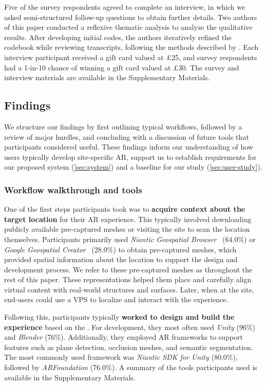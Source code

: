 Five of the survey respondents agreed to complete an interview, in which we asked semi-structured follow-up questions to obtain further details. Two authors of this paper conducted a reflexive thematic analysis to analyze the qualitative results. After developing initial codes, the authors iteratively refined the codebook while reviewing transcripts, following the methods described by \citet{braunThematicAnalysis2019}. Each interview participant received a gift card valued at £25, and survey respondents had a 1-in-10 chance of winning a gift card valued at £30. The survey and interview materials are available in the Supplementary Materials.

\subsection{Findings}
We structure our findings by first outlining typical workflows, followed by a review of major hurdles, and concluding with a discussion of future tools that participants considered useful. These findings inform our understanding of how users typically develop site-specific AR, support us to establish requirements for our proposed system (\cref{sec:system}) and a baseline for our study (\cref{sec:user-study}).

\subsubsection{Workflow walkthrough and tools}
One of the first steps participants took was to \textbf{acquire context about the target location} for their AR experience. This typically involved downloading publicly available pre-captured meshes or visiting the site to scan the location themselves. Participants primarily used \textit{Niantic Geospatial Browser}~\cite{nianticGeospatialBrowser} (64.0\%) or \textit{Google Geospatial Creator}~\cite{googleGeospatialCreator} (28.0\%) to obtain pre-captured meshes, which provided spatial information about the location to support the design and development process. We refer to these pre-captured meshes as \locMeshes throughout the rest of this paper. These representations helped them place and carefully align virtual content with real-world structures and surfaces. Later, when at the site, end-users could use a VPS to localize and interact with the experience.

Following this, participants typically \textbf{worked \exsitu[ ] to design and build the experience} based on the \locMesh. For development, they most often used \textit{Unity} (96\%) and \textit{Blender} (76\%). Additionally, they employed AR frameworks to support features such as plane detection, occlusion meshes, and semantic segmentation. The most commonly used framework was \textit{Niantic SDK for Unity} (80.0\%), followed by \textit{ARFoundation} (76.0\%). A summary of the tools participants used is available in the Supplementary Materials.

